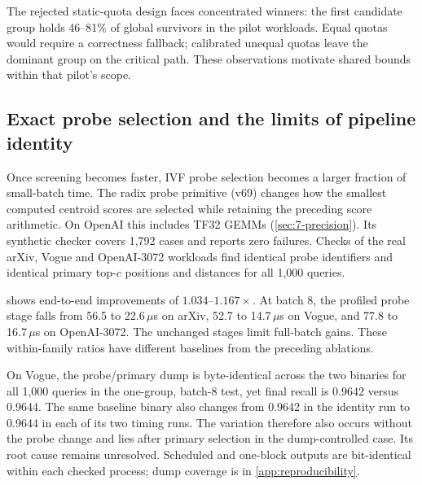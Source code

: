 The rejected static-quota design faces concentrated winners: the first
candidate group holds 46--81\% of global survivors in the pilot workloads.
Equal quotas would require a correctness fallback; calibrated unequal
quotas leave the dominant group on the critical path. These observations
motivate shared bounds within that pilot's scope.

\subsection{Exact probe selection and the limits of pipeline identity}

Once screening becomes faster, IVF probe selection becomes a larger
fraction of small-batch time. The radix probe primitive (v69) changes how the
smallest computed centroid scores are selected while retaining the
preceding score arithmetic. On OpenAI this includes TF32 GEMMs
(\cref{sec:7-precision}).
Its synthetic checker covers 1,792 cases and reports zero failures.
Checks of the real arXiv, Vogue and OpenAI-3072 workloads find identical
probe identifiers and identical primary top-$c$ positions and distances
for all 1,000 queries.

\begin{table}[tbp]
\centering
\caption[Probe-selection throughput ratios]{v69/v65 end-to-end throughput ratios for the exact computed-score probe
 change. Each workload--batch comparison has ten timing rounds per binary,
 collected in alternating runs. Values above one favour v69.}
\label{tab:7-probe}
\small

\end{table}

 shows end-to-end improvements of $1.034$--$1.167\times$.
At batch 8, the profiled probe stage falls from 56.5 to 22.6\,$\mu$s
on arXiv, 52.7 to 14.7\,$\mu$s on Vogue, and 77.8 to 16.7\,$\mu$s
on OpenAI-3072. The unchanged stages limit full-batch gains. These
within-family ratios have different baselines from the preceding ablations.

On Vogue, the probe/primary dump is
byte-identical across the two binaries for all 1,000 queries in the
one-group, batch-8 test, yet final recall is 0.9642 versus 0.9644. The
same baseline binary also changes from 0.9642 in the identity run to
0.9644 in each of its two timing runs. The variation therefore also
occurs without the probe change and lies after primary selection in the
dump-controlled case. Its root cause remains unresolved. Scheduled and
one-block outputs are bit-identical within each checked process; dump
coverage is in \cref{app:reproducibility}.

